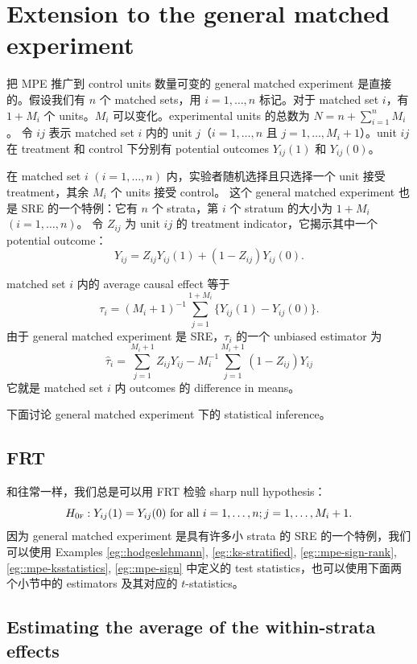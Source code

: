 \section{Extension to the general matched experiment}\label{sec::general-matched-experiment}

把 MPE 推广到 control units 数量可变的 general matched experiment 是直接的。假设我们有 $n$ 个 matched sets，用 $i=1, \ldots, n$ 标记。对于 matched set $i$，有 $1+M_i$ 个 units。$M_i$ 可以变化。experimental units 的总数为 $N = n + \sum_{i=1}^n M_i$。
令 $ij$ 表示 matched set $i$ 内的 unit $j$（$i=1,\ldots, n$ 且 $j=1,\ldots, M_i+1$）。unit $ij$ 在 treatment 和 control 下分别有 potential outcomes $Y_{ij}(1)$ 和 $Y_{ij}(0)$。


在 matched set $i$ $(i=1, \ldots, n)$ 内，实验者随机选择且只选择一个 unit 接受 treatment，其余 $M_i$ 个 units 接受 control。
这个 general matched experiment 也是 SRE 的一个特例：它有 $n$ 个 strata，第 $i$ 个 stratum 的大小为 $1+M_i$ $(i=1, \ldots, n)$。
令 $Z_{ij}$ 为 unit $ij$ 的 treatment indicator，它揭示其中一个 potential outcome：
$$
Y_{ij} = Z_{ij} Y_{ij}(1) + (1-Z_{ij}) Y_{ij}(0) . 
$$ 

matched set $i$ 内的 average causal effect 等于
$$
\tau_i = (M_i + 1)^{-1} \sum_{j=1}^{1+M_i} \{ Y_{ij}(1)-Y_{ij}(0) \}. 
$$
由于 general matched experiment 是 SRE，$\tau_i $ 的一个 unbiased estimator 为
$$
\hat \tau_i = \sum_{j=1}^{M_i + 1} Z_{ij} Y_{ij} - M_i^{-1} \sum_{j=1}^{M_i+1} (1-Z_{ij}) Y_{ij}
$$
它就是 matched set $i$ 内 outcomes 的 difference in means。

下面讨论 general matched experiment 下的 statistical inference。


\subsection{FRT}

和往常一样，我们总是可以用 FRT 检验 sharp null hypothesis：
$$
H_{0\textsc{f}}: Y_{ij}(1) = Y_{ij}(0)  \text{ for all }  i=1,\ldots, n; j=1,\ldots, M_i+1. 
$$
因为 general matched experiment 是具有许多小 strata 的 SRE 的一个特例，我们可以使用 Examples \ref{eg::hodgeslehmann}, \ref{eg::ks-stratified}, \ref{eg::mpe-sign-rank}, \ref{eg::mpe-ksstatistics}, \ref{eg::mpe-sign} 中定义的 test statistics，也可以使用下面两个小节中的 estimators 及其对应的 $t$-statistics。



\subsection{Estimating the average of the within-strata effects}


